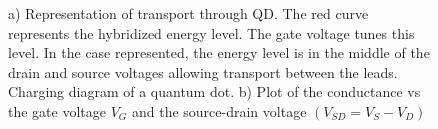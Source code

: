 \begin{figure}[t]
     \centering
    
     \caption{ a) Representation of transport through QD. The red curve represents the hybridized energy level. The gate voltage tunes this level. In the case represented, the energy level is in the middle of the drain and source voltages allowing transport between the leads.   Charging diagram of a quantum dot. b) Plot of the conductance vs the gate voltage $V_G$ and the source-drain voltage $(V_{SD}=V_{S}-V_{D} )$ \protect{}}
\end{figure}


